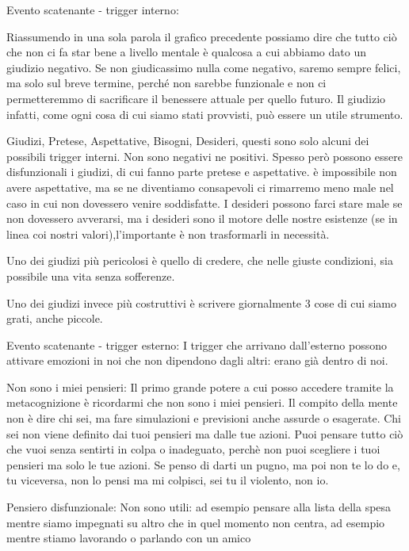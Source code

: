 \documentclass[12pt]{book} %
\begin{document}
\clearpage
\bigskip

Evento scatenante - trigger interno:

Riassumendo in una sola parola il grafico precedente possiamo dire che tutto ciò che non ci fa star bene a livello
mentale è qualcosa a cui abbiamo dato un giudizio negativo. Se non giudicassimo nulla come negativo, saremo sempre
felici, ma solo sul breve termine, perché non sarebbe funzionale e non ci permetteremmo di sacrificare il benessere attuale per quello futuro. 
Il giudizio infatti, come ogni cosa di cui siamo stati provvisti, può essere un utile strumento. 

Giudizi, Pretese, Aspettative, Bisogni, Desideri, questi sono solo alcuni dei possibili trigger interni. Non sono
negativi ne positivi. Spesso però possono essere disfunzionali i giudizi, di cui fanno parte pretese e aspettative. è
impossibile non avere aspettative, ma se ne diventiamo consapevoli ci rimarremo meno male nel caso in cui non dovessero
venire soddisfatte. I desideri possono farci stare male se non dovessero avverarsi, ma i desideri sono il motore delle
nostre esistenze (se in linea coi nostri valori),l'importante è non trasformarli in necessità.

Uno dei giudizi più pericolosi è quello di credere, che nelle giuste condizioni, sia possibile una vita senza
sofferenze.

Uno dei giudizi invece più costruttivi è scrivere giornalmente 3 cose di cui siamo grati, anche piccole.


\bigskip

Evento scatenante - trigger esterno: I trigger che arrivano dall'esterno possono attivare emozioni in noi che non
dipendono dagli altri: erano già dentro di noi.
\newline
\newline

Non sono i miei pensieri: Il primo grande potere a cui posso accedere tramite la metacognizione è ricordarmi che non
sono i miei pensieri. Il compito della mente non è dire chi sei, ma fare simulazioni e previsioni anche assurde o
esagerate. Chi sei non viene definito dai tuoi pensieri ma dalle tue azioni. Puoi pensare tutto ciò che vuoi senza
sentirti in colpa o inadeguato, perchè non puoi scegliere i tuoi pensieri ma solo le tue azioni. Se penso di darti un
pugno, ma poi non te lo do e, tu viceversa, non lo pensi ma mi colpisci, sei tu il violento, non io. 


\bigskip

Pensiero disfunzionale: Non sono utili: ad esempio pensare alla lista della spesa mentre siamo impegnati su altro che in
quel momento non centra, ad esempio mentre stiamo lavorando o parlando con un amico 
\end{document}
